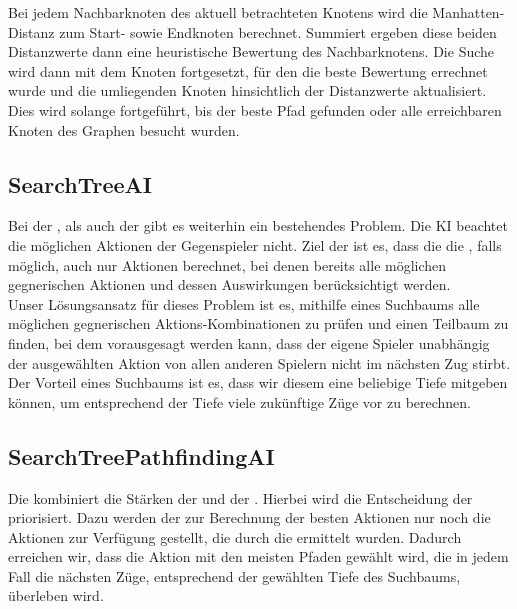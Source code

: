 Bei jedem Nachbarknoten des aktuell betrachteten Knotens wird die Manhatten-Distanz zum Start- sowie Endknoten
berechnet.
Summiert ergeben diese beiden Distanzwerte dann eine heuristische Bewertung des Nachbarknotens.
Die Suche wird dann mit dem Knoten fortgesetzt, für den die beste Bewertung errechnet wurde und die umliegenden Knoten
hinsichtlich der Distanzwerte aktualisiert.
Dies wird solange fortgeführt, bis der beste Pfad gefunden oder alle erreichbaren Knoten des Graphen besucht wurden.

\subsection{SearchTreeAI}
\label{subsec:searchtree-ai}

Bei der , als auch der  gibt es weiterhin ein bestehendes
Problem.
Die \ac{KI} beachtet die möglichen Aktionen der Gegenspieler nicht.
Ziel der  ist es, dass die die , falls möglich, auch nur Aktionen berechnet,
bei denen bereits alle möglichen gegnerischen Aktionen und dessen Auswirkungen berücksichtigt werden. \\

Unser Lösungsansatz für dieses Problem ist es, mithilfe eines Suchbaums alle möglichen gegnerischen
Aktions-Kombinationen zu prüfen und einen Teilbaum zu finden, bei dem vorausgesagt werden kann, dass
der eigene Spieler unabhängig der ausgewählten Aktion von allen anderen Spielern nicht im nächsten Zug stirbt.
Der Vorteil eines Suchbaums ist es, dass wir diesem eine
beliebige Tiefe mitgeben können, um entsprechend der Tiefe viele zukünftige Züge vor zu berechnen.

\subsection{SearchTreePathfindingAI}
\label{subsec:searchtree-pathfinding-ai}

Die  kombiniert die Stärken der  und der .
Hierbei wird die Entscheidung der  priorisiert.
Dazu werden der  zur Berechnung der besten Aktionen nur noch die Aktionen zur Verfügung gestellt, die
durch die  ermittelt wurden.
Dadurch erreichen wir, dass die Aktion mit den meisten Pfaden gewählt wird, die in jedem Fall die nächsten Züge,
entsprechend der gewählten Tiefe des Suchbaums, überleben wird.

